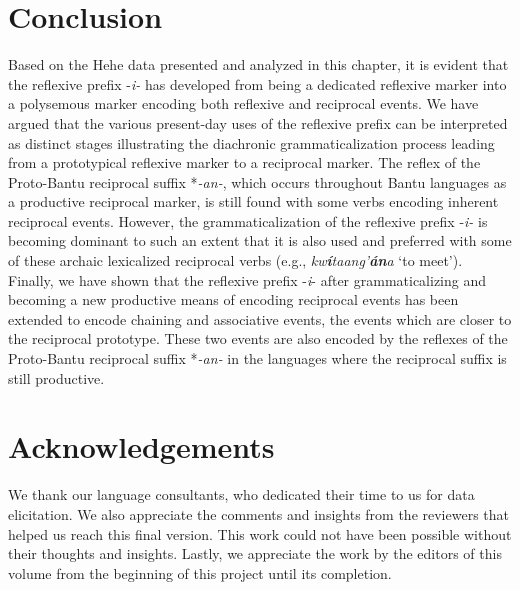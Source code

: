 \documentclass[output=paper,
            colorlinks, citecolor=brown
            ,draftmode
		  ]{langscibook}
\begin{document}
\section{Conclusion}\label{sec:ngwasi:5}

Based on the Hehe data presented and analyzed in this chapter, it is evident that the reflexive prefix -\textit{i-} has developed from being a dedicated reflexive marker into a polysemous marker encoding both reflexive and reciprocal events. We have argued that the various present\nobreakdash-day uses of the reflexive prefix can be interpreted as distinct stages illustrating the diachronic grammaticalization process leading from a prototypical reflexive marker to a reciprocal marker. The reflex of the Proto-Bantu reciprocal suffix *\textit{{}-an-}, which occurs throughout Bantu languages as a productive reciprocal marker, is still found with some verbs encoding inherent reciprocal events. However, the grammaticalization of the reflexive prefix -\textit{i-} is becoming dominant to such an extent that it is also used and preferred with some of these archaic lexicalized reciprocal verbs (e.g., \textit{kw}\textbf{\textit{í}}\textit{taang’}\textbf{\textit{án}}\textit{a} ‘to meet’).  Finally, we have shown that the reflexive prefix -\textit{i}{}- after grammaticalizing and becoming a new productive means of encoding reciprocal events has been extended to encode chaining and associative events, the events which are closer to the reciprocal prototype. These two events are also encoded by the reflexes of the Proto-Bantu reciprocal suffix *\textit{{}-an-} in the languages where the reciprocal suffix is still productive.

\section*{Acknowledgements}
We thank our language consultants, who dedicated their time to us for data elicitation. We also appreciate the comments and insights from the reviewers that helped us reach this final version. This work could not have been possible without their thoughts and insights. Lastly, we appreciate the work by the editors of this volume from the beginning of this project until its completion.  
\end{document}
